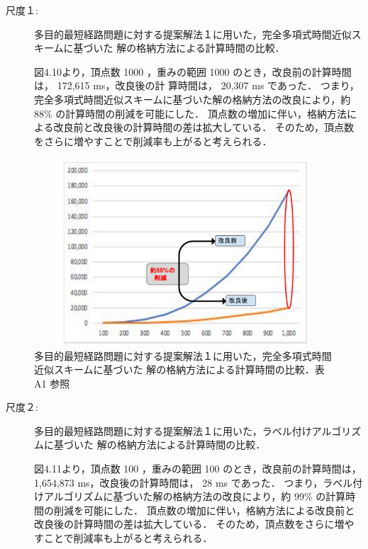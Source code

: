 \documentclass[12pt]{optlab-bachelor}
\begin{document}
\begin{description}
  \item[尺度１:]
  多目的最短経路問題に対する提案解法１に用いた，完全多項式時間近似スキームに基づいた
  解の格納方法による計算時間の比較．

  図4.10より，頂点数 1000 ，重みの範囲 1000 のとき，改良前の計算時間は， 172,615 ms，改良後の計 算時間は， 20,307 ms であった．
  つまり，完全多項式時間近似スキームに基づいた解の格納方法の改良により，約 88\% の計算時間の削減を可能にした．
  頂点数の増加に伴い，格納方法による改良前と改良後の計算時間の差は拡大している．
  そのため，頂点数をさらに増やすことで削減率も上がると考えられる．

\end{description}

\begin{figure}[htbp]
  \centering
  \includegraphics[height=7.0cm , width=15.0cm]{fig/fig13.pdf}
  \caption{多目的最短経路問題に対する提案解法１に用いた，完全多項式時間近似スキームに基づいた
  解の格納方法による計算時間の比較．表 A1 参照}
\end{figure}


\begin{description}
  \item[尺度２:]
  多目的最短経路問題に対する提案解法１に用いた，ラベル付けアルゴリズムに基づいた
  解の格納方法による計算時間の比較．

  図4.11より，頂点数 100 ，重みの範囲 100 のとき，改良前の計算時間は， 1,654,873 ms，改良後の計算時間は， 28 ms であった．
  つまり，ラベル付けアルゴリズムに基づいた解の格納方法の改良により，約 99\% の計算時間の削減を可能にした．
  頂点数の増加に伴い，格納方法による改良前と改良後の計算時間の差は拡大している．
  そのため，頂点数をさらに増やすことで削減率も上がると考えられる．

\end{description}
\end{document}
